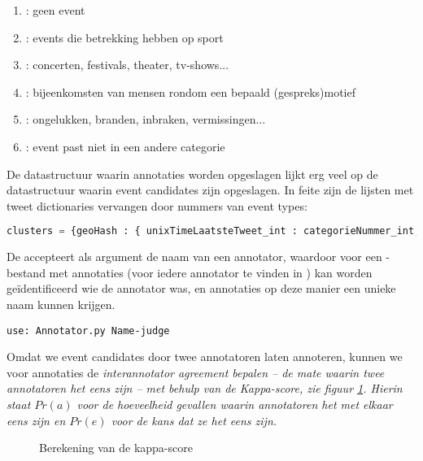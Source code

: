 {{\begin{enumerate}
\item {}: geen event
\item {}: events die betrekking hebben op sport
\item {}: concerten, festivals, theater, tv-shows...
\item {}: bijeenkomsten van mensen rondom een bepaald (gespreks)motief
\item {}: ongelukken, branden, inbraken, vermissingen...
\item {}: event past niet in een andere categorie
\end{enumerate}

De datastructuur waarin annotaties worden opgeslagen lijkt erg veel op de 
datastructuur waarin event candidates zijn opgeslagen. In feite zijn de lijsten 
met tweet dictionaries vervangen door nummers van event types:

\begin{lstlisting}[language=Python]
clusters = {geoHash : { unixTimeLaatsteTweet_int : categorieNummer_int, ... }, ... }
\end{lstlisting}

De  accepteert als argument de naam van een annotator, waardoor voor 
een -bestand met annotaties (voor iedere annotator te vinden in 
) kan worden ge\"identificeerd wie de 
annotator was, en annotaties op deze manier een unieke naam kunnen krijgen.

\begin{lstlisting}
use: Annotator.py Name-judge
\end{lstlisting}
\vspace*{-10pt}

\label{AnnotationEvaluation}

Omdat we event candidates door twee annotatoren laten annoteren, kunnen we voor 
annotaties de \it{interannotator agreement} bepalen – de mate waarin twee annotatoren 
het eens zijn – met behulp van de \it{Kappa-score}, zie figuur \ref{kappa}. Hierin staat $Pr(a)$ 
voor de hoeveelheid gevallen waarin annotatoren het met elkaar eens zijn en 
$Pr(e)$ voor de kans dat ze het eens zijn.

\begin{figure}[H]
  \centering
    \caption{Berekening van de kappa-score}
  \label{kappa}
\end{figure}

}}
